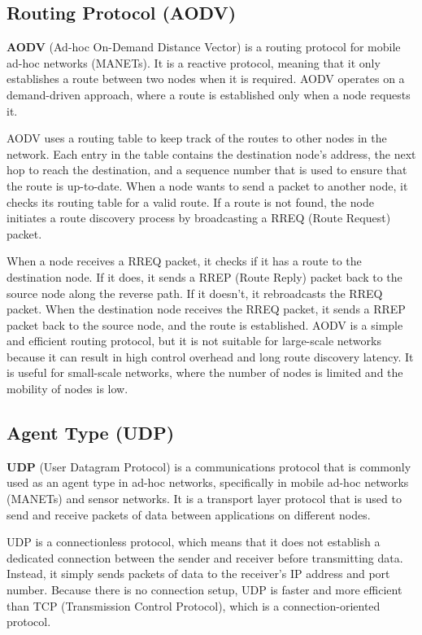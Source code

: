 \documentclass[14pt]{scrartcl} %
\begin{document}
\subsection{Routing Protocol (AODV)}
\textbf{AODV} (Ad-hoc On-Demand Distance Vector) is a routing protocol for mobile ad-hoc networks (MANETs). It is a reactive protocol, meaning that it only establishes a route between two nodes when it is required. AODV operates on a demand-driven approach, where a route is established only when a node requests it.

AODV uses a routing table to keep track of the routes to other nodes in the network. Each entry in the table contains the destination node's address, the next hop to reach the destination, and a sequence number that is used to ensure that the route is up-to-date. When a node wants to send a packet to another node, it checks its routing table for a valid route. If a route is not found, the node initiates a route discovery process by broadcasting a RREQ (Route Request) packet.

When a node receives a RREQ packet, it checks if it has a route to the destination node. If it does, it sends a RREP (Route Reply) packet back to the source node along the reverse path. If it doesn't, it rebroadcasts the RREQ packet. When the destination node receives the RREQ packet, it sends a RREP packet back to the source node, and the route is established.
AODV is a simple and efficient routing protocol, but it is not suitable for large-scale networks because it can result in high control overhead and long route discovery latency. It is useful for small-scale networks, where the number of nodes is limited and the mobility of nodes is low.
\subsection{Agent Type (UDP)}
\textbf{UDP} (User Datagram Protocol) is a communications protocol that is commonly used as an agent type in ad-hoc networks, specifically in mobile ad-hoc networks (MANETs) and sensor networks. It is a transport layer protocol that is used to send and receive packets of data between applications on different nodes.

UDP is a connectionless protocol, which means that it does not establish a dedicated connection between the sender and receiver before transmitting data. Instead, it simply sends packets of data to the receiver's IP address and port number. Because there is no connection setup, UDP is faster and more efficient than TCP (Transmission Control Protocol), which is a connection-oriented protocol.
\end{document}

